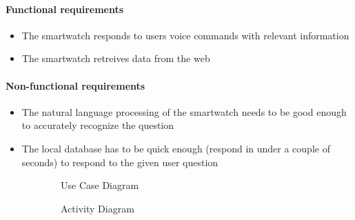 \documentclass{article}
\begin{document}
		\paragraph{Functional requirements}
			\begin{itemize}
				\item The smartwatch responds to users voice commands with relevant information
				\item The smartwatch retreives data from the web
			\end{itemize}
			
			\paragraph{Non-functional requirements}
			\begin{itemize}
				\item The natural language processing of the smartwatch needs to be good enough to accurately recognize the question
				\item The local database has to be quick enough (respond in under a couple of seconds) to respond to the given user question
			\end{itemize}
		\clearpage
	
	
		\begin{figure}[htbp]
			\centering
			\begin{subfigure}{\textwidth}
				\centering
				
				\caption{Use Case Diagram}
			\end{subfigure}
			\begin{subfigure}{\textwidth}
			\end{subfigure}
		\end{figure}
		\clearpage
		
		\begin{figure}[htbp]
			\centering
			\begin{subfigure}{\textwidth}
				\centering
				
				\caption{Activity Diagram}
			\end{subfigure}
			\begin{subfigure}{\textwidth}
			\end{subfigure}
		\end{figure}
		\clearpage
		
\end{document}

